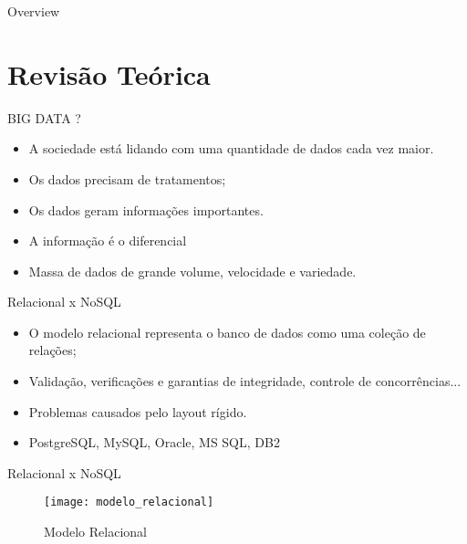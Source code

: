 
\begin{frame}
\titlepage
\end{frame}

\begin{frame}{Overview}
  \tableofcontents
\end{frame}

\section{Revisão Teórica}

\begin{frame}{BIG DATA ?}
    \begin{itemize}
    \item A sociedade está lidando com uma quantidade de dados cada vez maior.
    \item Os dados precisam de tratamentos;
    \item Os dados geram informações importantes.
    \item A informação é o diferencial
    \item Massa de dados de grande volume, velocidade e variedade.
    \end{itemize}
\end{frame}

\begin{frame}{Relacional x NoSQL}
    \begin{itemize}
    \item O modelo relacional representa o banco de dados como uma coleção de relações;
    \item Validação, verificações e garantias de integridade, controle de concorrências...
    \item Problemas causados pelo layout rígido.
    \item PostgreSQL, MySQL, Oracle, MS SQL, DB2
    \end{itemize}
\end{frame}

\begin{frame}{Relacional x NoSQL}
	\begin{figure}[!htbp]
		\begin{center}
			\texttt{[image: modelo\_relacional]}
		\end{center}
		\caption{Modelo Relacional }
		\label{fig:modelorelacional}
	\end{figure}
\end{frame}

